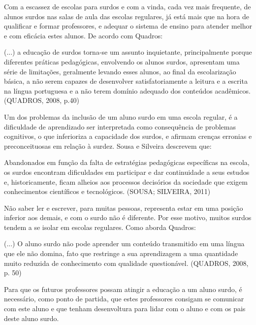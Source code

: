 \documentclass[brasil]{abnt}
\begin{document}
	Com a escassez de escolas para surdos e com a vinda, cada vez mais frequente, de alunos surdos nas salas de aula das escolas regulares, já está mais que na hora de 
	qualificar e formar professores, e adequar o sistema de ensino para atender melhor e com eficácia estes alunos. De acordo com Quadros:
	
		\begin{citacao}(...) a educação de surdos torna-se um assunto inquietante, principalmente porque diferentes práticas pedagógicas, envolvendo os alunos surdos, apresentam
						uma série de limitações, geralmente levando esses alunos, ao final da escolarização básica, a não serem capazes de desenvolver satisfatoriamente a leitura 
						e a escrita na língua portuguesa e a não terem domínio adequado dos conteúdos acadêmicos. (QUADROS, 2008, p.40)
		\end{citacao}
	
	Um dos problemas da inclusão de um aluno surdo em uma escola regular, é a dificuldade de aprendizado ser interpretada como consequência de problemas cognitivos, o que inferioriza
	a capacidade dos surdos, e afirmam crenças erronias e preconceituosas em relação à surdez. Sousa e Silveira descrevem que:
	
		\begin{citacao} Abandonados em função da falta de estratégias pedagógicas específicas na escola, os surdos encontram dificuldades em participar e dar continuidade a
						seus estudos e, historicamente, ficam alheios aos processos decisórios da sociedade que exigem conhecimentos científicos e tecnológicos. (SOUSA; SILVEIRA, 2011)
		\end{citacao}
		
	Não saber ler e escrever, para muitas pessoas, representa estar em uma posição inferior aos demais, e com o surdo não é diferente. Por esse motivo, muitos surdos tendem a se isolar em
	escolas regulares. Como aborda Quadros:
	
		\begin{citacao}(...) O aluno surdo não pode aprender um conteúdo transmitido em uma língua que ele não domina, fato que restringe a sua aprendizagem a uma quantidade muito reduzida
						de conhecimento com qualidade questionável. (QUADROS, 2008, p. 50)		
		\end{citacao}
	
	Para que os futuros professores possam atingir a educação a um aluno surdo, é necessário, como ponto de partida, que estes professores consigam se comunicar com este aluno e que tenham desenvoltura 
	para lidar com o aluno e com os pais deste aluno surdo.
\end{document}
